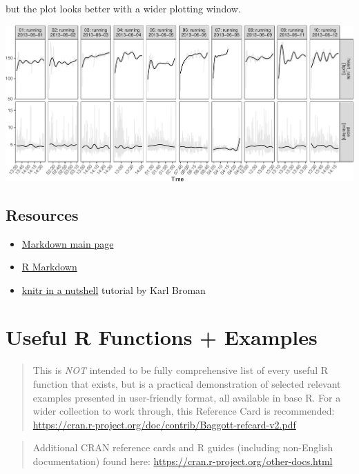 \documentclass[]{book}
\providecommand{\tightlist}{%
  \setlength{\itemsep}{0pt}\setlength{\parskip}{0pt}}
\begin{document}
but the plot looks better with a wider plotting window.

\includegraphics{code4stem_files/figure-latex/unnamed-chunk-5-1.pdf}

\hypertarget{resources}{%
\section{Resources}\label{resources}}

\begin{itemize}
\tightlist
\item
  \href{http://daringfireball.net/projects/markdown/}{Markdown main page}
\item
  \href{http://rmarkdown.rstudio.com/}{R Markdown}
\item
  \href{http://kbroman.org/knitr_knutshell/}{knitr in a nutshell} tutorial by Karl Broman
\end{itemize}

\hypertarget{useful-r-functions-examples}{%
\chapter{Useful R Functions + Examples}\label{useful-r-functions-examples}}

\begin{quote}
This is \emph{NOT} intended to be fully comprehensive list of every useful R function that exists, but is a practical demonstration of selected relevant examples presented in user-friendly format, all available in base R. For a wider collection to work through, this Reference Card is recommended: \url{https://cran.r-project.org/doc/contrib/Baggott-refcard-v2.pdf}
\end{quote}

\begin{quote}
Additional CRAN reference cards and R guides (including non-English documentation) found here: \url{https://cran.r-project.org/other-docs.html}
\end{quote}
\end{document}
